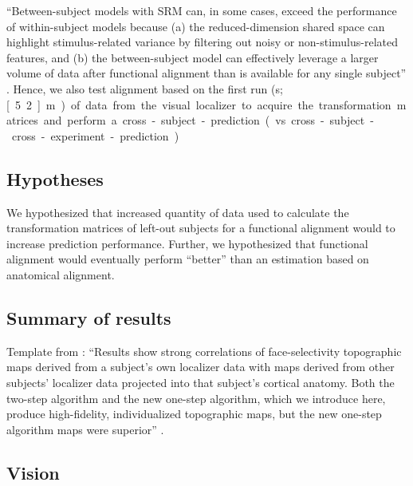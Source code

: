 
%
``Between-subject models with SRM can, in some cases, exceed the performance of
within-subject models because (a) the reduced-dimension shared space can
highlight stimulus-related variance by filtering out noisy or
non-stimulus-related features, and (b) the between-subject model can effectively
leverage a larger volume of data after functional alignment than is available
for any single subject'' \citep{kumar2020brainiak}.
%
Hence, we also test alignment based on the first run (\unit[312]{s};
\unit[5.2]{m}) of data from
the visual localizer to acquire the transformation matrices and perform a
cross-subject-prediction (vs. cross-subject-cross-experiment-prediction)


\subsection{Hypotheses}


%
We hypothesized that increased quantity of data used to calculate the
transformation matrices of left-out subjects for a functional alignment would to
increase prediction performance.
%
Further, we hypothesized that functional alignment would eventually perform
``better'' than an estimation based on anatomical alignment.


\subsection{Summary of results}

%
Template from \citet{jiahui2020predicting}: ``Results show strong correlations
of face-selectivity topographic maps derived from a subject's own localizer data
with maps derived from other subjects' localizer data projected into that
subject's cortical anatomy. Both the two-step algorithm and the new one-step
algorithm, which we introduce here, produce high-fidelity, individualized
topographic maps, but the new one-step algorithm maps were superior''
\citep{jiahui2020predicting}.


\subsection{Vision}

